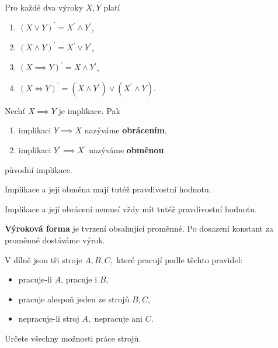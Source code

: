 \begin{veta}
  Pro každé dva výroky $X,Y$ platí
  \begin{enumerate}[$i.$]
    \item $(X\lor Y)^\prime = X^\prime \land Y^\prime$,
    \item $(X\land Y)^\prime = X^\prime \lor Y^\prime$,
    \item $(X\implies Y)^\prime = X\land Y^\prime$,
    \item $(X\iff Y)^\prime = (X\land Y^\prime) \lor (X^\prime \land Y)$.
  \end{enumerate}
\end{veta}

\begin{definition}
  Nechť $X\implies Y$ je implikace. Pak
  \begin{enumerate}[$i.$]
    \item implikaci $Y\implies X$ nazýváme \textbf{obrácením},
    \item implikaci $Y^\prime \implies X^\prime$ nazýváme \textbf{obměnou}
  \end{enumerate}
  původní implikace.
\end{definition}

\begin{veta}
  Implikace a její obměna mají tutéž pravdivostní hodnotu.
\end{veta}

\begin{pozn}
  Implikace a její obrácení nemusí vždy mít tutéž pravdivostní hodnotu.
\end{pozn}

\begin{definition}
  \textbf{Výroková forma} je tvrzení obsahující proměnné. Po dosazení konstant za proměnné dostáváme výrok.
\end{definition}

\begin{priklad}\label{prstroje}
    V dílně jsou tři stroje $A,B,C,$ které pracují podle těchto pravidel:
    \begin{itemize}
    \item pracuje-li $A$, pracuje i $B$,
   	\item pracuje alespoň jeden ze strojů $B,C$,
   	\item nepracuje-li stroj $A,$ nepracuje ani $C.$
    \end{itemize}
    Určete všechny možnosti práce strojů.
\end{priklad}

